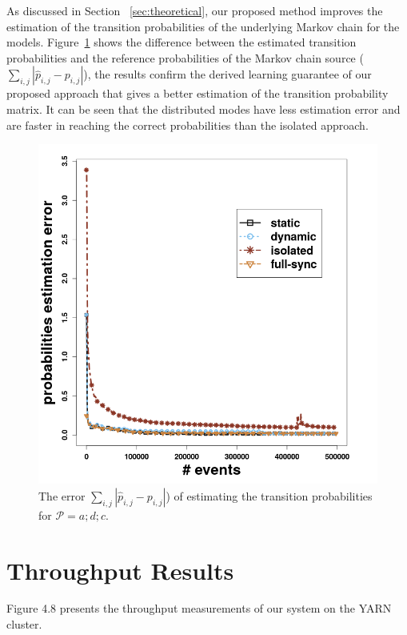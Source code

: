 As discussed in Section ~\ref{sec:theoretical}, our proposed method improves the estimation of the transition probabilities of the underlying Markov chain for the \pmcmr models. Figure~\ref{fig:error_synthetic} shows the difference between the estimated transition probabilities and the reference probabilities of the Markov chain source ($\sum_{i,j} |\hat{p}_{i,j} - {p}_{i,j}|$), the results confirm the derived learning guarantee of our proposed approach that gives a better estimation of the transition probability matrix. It can be seen that the distributed modes have less estimation error and are faster in reaching the correct probabilities than the isolated approach.  
\begin{figure}[H]
	\centering
	\includegraphics[width=\textwidth]{chapters/figures/synthetic/error_synthetic_15_0001.png}
	
	\caption{The error  $\sum_{i,j} |\hat{p}_{i,j} - {p}_{i,j}|$) of estimating the transition probabilities  for $\mathcal{P}=a;d;c$.}
	\label{fig:error_synthetic}
\end{figure}




\section{Throughput Results}
\label{sec:throughput}
Figure 4.8 presents the throughput measurements of our system on the YARN cluster.  

